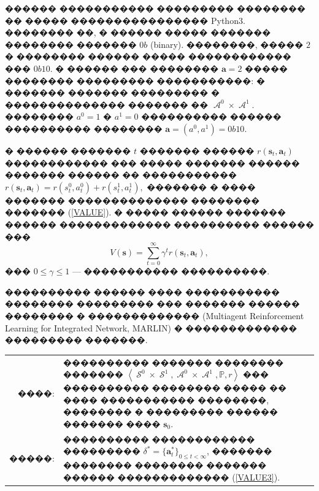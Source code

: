 \documentclass[11pt]{ubs}
\DeclareMathOperator{\state}{\mathcal{S}}
\DeclareMathOperator{\action}{\mathcal{A}}
\begin{document}
������ �����������  ��������� �������� �� ����� ����������������  Python3.
�������� ��, � ������ ����� ������� �������� ������� $0b$ (binary). ��������, ����� $2$ � �������� ������ ����� ������������ ���  $0b10$.
�  ������ ��� �������� $\textbf{a}=2$ ����� �������� ��������� �����������: � ������� ������� ��������� � �������������� ������� �� $\action^0\times \action^1$. �������� $a^0 =1$ � $a^1 =0$  ����������  ������ ���������� �������� $\textbf{a} = \left(a^0,a^1\right) = 0b10$.


� ������ ������� $t$ ������� ������ $r(\textbf{s}_t,\textbf{a}_t)$ ������������ ��� ����� ������� ������ ������� ������ �� ����������� $r(\textbf{s}_t,\textbf{a}_t) = r(s_t^0,a_t^0) + r(s_t^1,a_t^1),$ ������� � ���� ������� �������������� �������� ������� (\ref{VALUE}).
� ����� ������ ������� ������ ������������� ���������� ������ ���
\begin{equation}\label{VALUE3}
  \displaystyle V(\textbf{s}) =  \sum\limits_{t=0}^{\infty}\gamma^t r(\textbf{s}_t,\textbf{a}_t),
\end{equation}
��� $0 \leq \gamma \leq 1$ --- ����������� ����������.

���������� ������ ���� ����������� �������� ��������� ��� ������� ������ �������� � ������������� (Multiagent Reinforcement Learning for   Integrated Network, MARLIN) � ������������� ��������� �������.
\begin{center}
  \begin{tabular}{rp{}}
    {\sf ����}:
     &
    \parbox[t]{0.85\textwidth}{���������� ������� �������� �������
      $\left\langle  \state^0\times \state^1, \action^0\times \action^1, \mathbb{P}, r \right\rangle$ ��� ���������� �������� ����� �� ���� ����������� ��������, ��������  � ��������� ������ ������� ���� $\textbf{s}_0$.}
    \\
    {\sf �����}:
     &
    \parbox[t]{0.85\textwidth}{
    ���������� ������������ ���������  $\delta^*=\{ \textbf{a}^*_t\}_{0\leq t<\infty}$, ������� �������� �������� ������� ������  �������������  (\ref{VALUE3}). }
  \end{tabular}
\end{center}


\end{document}
